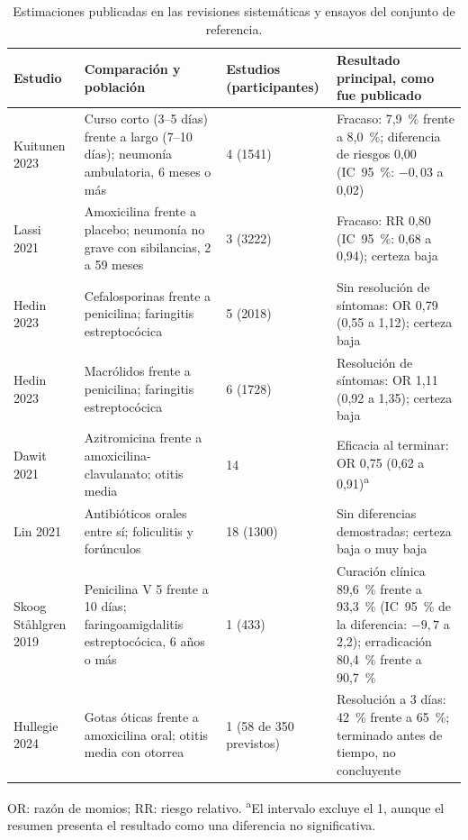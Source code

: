 \documentclass[10pt,a4paper]{article}
\begin{document}
\begin{table}[htbp]
\centering
\caption{Estimaciones publicadas en las revisiones sistemáticas y ensayos del conjunto de referencia.}
\scriptsize
\begin{tabularx}{\textwidth}{@{}lXlX@{}}
\toprule
Estudio & Comparación y población & Estudios (participantes) & Resultado principal, como fue publicado \\
\midrule
Kuitunen 2023~\citep{kuitunen2023} & Curso corto (3--5 días) frente a largo (7--10 días); neumonía ambulatoria, 6 meses o más & 4 (\num{1541}) & Fracaso: 7,9~\% frente a 8,0~\%; diferencia de riesgos 0,00 (IC~95~\%: $-0{,}03$ a 0,02) \\
Lassi 2021~\citep{lassi2021} & Amoxicilina frente a placebo; neumonía no grave con sibilancias, 2 a 59 meses & 3 (\num{3222}) & Fracaso: RR 0,80 (IC~95~\%: 0,68 a 0,94); certeza baja \\
Hedin 2023~\citep{hedin2023} & Cefalosporinas frente a penicilina; faringitis estreptocócica & 5 (\num{2018}) & Sin resolución de síntomas: OR 0,79 (0,55 a 1,12); certeza baja \\
Hedin 2023~\citep{hedin2023} & Macrólidos frente a penicilina; faringitis estreptocócica & 6 (\num{1728}) & Resolución de síntomas: OR 1,11 (0,92 a 1,35); certeza baja \\
Dawit 2021~\citep{dawit2021} & Azitromicina frente a amoxicilina-clavulanato; otitis media & 14 & Eficacia al terminar: OR 0,75 (0,62 a 0,91)\textsuperscript{a} \\
Lin 2021~\citep{lin2021} & Antibióticos orales entre sí; foliculitis y forúnculos & 18 (\num{1300}) & Sin diferencias demostradas; certeza baja o muy baja \\
Skoog Ståhlgren 2019~\citep{skoog2019} & Penicilina V 5 frente a 10 días; faringoamigdalitis estreptocócica, 6 años o más & 1 (433) & Curación clínica 89,6~\% frente a 93,3~\% (IC~95~\% de la diferencia: $-9{,}7$ a 2,2); erradicación 80,4~\% frente a 90,7~\% \\
Hullegie 2024~\citep{hullegie2024} & Gotas óticas frente a amoxicilina oral; otitis media con otorrea & 1 (58 de 350 previstos) & Resolución a 3 días: 42~\% frente a 65~\%; terminado antes de tiempo, no concluyente \\
\bottomrule
\end{tabularx}

\vspace{2pt}
\begin{minipage}{0.95\textwidth}\footnotesize
OR: razón de momios; RR: riesgo relativo. \textsuperscript{a}El intervalo excluye el 1, aunque el resumen presenta el resultado como una diferencia no significativa.
\end{minipage}
\end{table}
\end{document}
